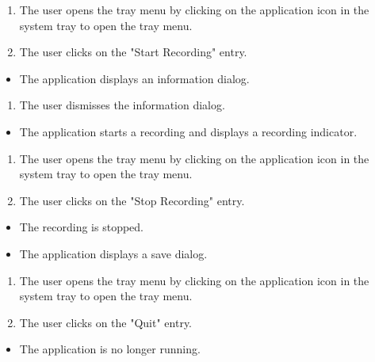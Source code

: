\begin{tests}
    {\begin{enumerate}
        \item The \gls{user} opens the tray menu by clicking on the application icon in the system tray to open the tray menu.
        \item The \gls{user} clicks on the "Start Recording" entry.
    \end{enumerate}}
    {\begin{itemize}
        \item The application displays an information dialog.
    \end{itemize}}
    
    {\begin{enumerate}
        \item The \gls{user} dismisses the information dialog.
    \end{enumerate}}
    {\begin{itemize}
        \item The application starts a recording and displays a recording indicator.
    \end{itemize}}
    
    {\begin{enumerate}
        \item The \gls{user} opens the tray menu by clicking on the application icon in the system tray to open the tray menu.
        \item The \gls{user} clicks on the "Stop Recording" entry.
    \end{enumerate}}
    {\begin{itemize}
        \item The recording is stopped.
        \item The application displays a save dialog.
    \end{itemize}}
\newpage
    {\begin{enumerate}
        \item The \gls{user} opens the tray menu by clicking on the application icon in the system tray to open the tray menu.
        \item The \gls{user} clicks on the "Quit" entry.
    \end{enumerate}}
    {\begin{itemize}
        \item The application is no longer running.
    \end{itemize}}


\end{tests}
